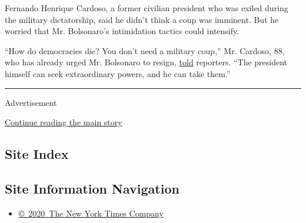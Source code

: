 Fernando Henrique Cardoso, a former civilian president who was exiled
during the military dictatorship, said he didn't think a coup was
imminent. But he worried that Mr. Bolsonaro's intimidation tactics could
intensify.

``How do democracies die? You don't need a military coup,'' Mr. Cardoso,
88, who has already urged Mr. Bolsonaro to resign,
\href{https://brasil.elpais.com/brasil/2020-05-31/fhc-quem-vai-ser-responsabilizado-pelos-erros-do-governo-queiram-ou-nao-serao-os-militares.html}{told}
reporters. ``The president himself can seek extraordinary powers, and he
can take them.''

\begin{center}\rule{0.5\linewidth}{\linethickness}\end{center}

Advertisement

\protect\hyperlink{after-bottom}{Continue reading the main story}

\hypertarget{site-index}{%
\subsection{Site Index}\label{site-index}}

\hypertarget{site-information-navigation}{%
\subsection{Site Information
Navigation}\label{site-information-navigation}}

\begin{itemize}
\tightlist
\item
  \href{https://help.nytimes3xbfgragh.onion/hc/en-us/articles/115014792127-Copyright-notice}{©~2020~The
  New York Times Company}
\end{itemize}

